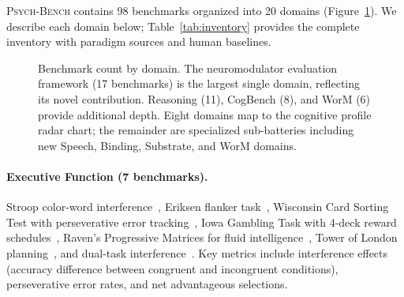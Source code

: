 \documentclass[11pt,letterpaper]{article}
\newcommand{\psychbench}{\textsc{Psych-Bench}}
\begin{document}
\psychbench{} contains 98 benchmarks organized into 20 domains (Figure~\ref{fig:domain_matrix}). We describe each domain below; Table~\ref{tab:inventory} provides the complete inventory with paradigm sources and human baselines.

\begin{figure}[t]
\centering
{}
\caption{Benchmark count by domain. The neuromodulator evaluation framework (17 benchmarks) is the largest single domain, reflecting its novel contribution. Reasoning (11), CogBench (8), and WorM (6) provide additional depth. Eight domains map to the cognitive profile radar chart; the remainder are specialized sub-batteries including new Speech, Binding, Substrate, and WorM domains.}
\label{fig:domain_matrix}
\end{figure}

\paragraph{Executive Function (7 benchmarks).} Stroop color-word interference~\citep{stroop1935interference,macleod1991half}, Eriksen flanker task~\citep{eriksen1974effects}, Wisconsin Card Sorting Test with perseverative error tracking~\citep{berg1948simple}, Iowa Gambling Task with 4-deck reward schedules~\citep{bechara1994insensitivity}, Raven's Progressive Matrices for fluid intelligence~\citep{raven1938progressive}, Tower of London planning~\citep{shallice1982specific}, and dual-task interference~\citep{pashler1994dual}. Key metrics include interference effects (accuracy difference between congruent and incongruent conditions), perseverative error rates, and net advantageous selections.
\end{document}
